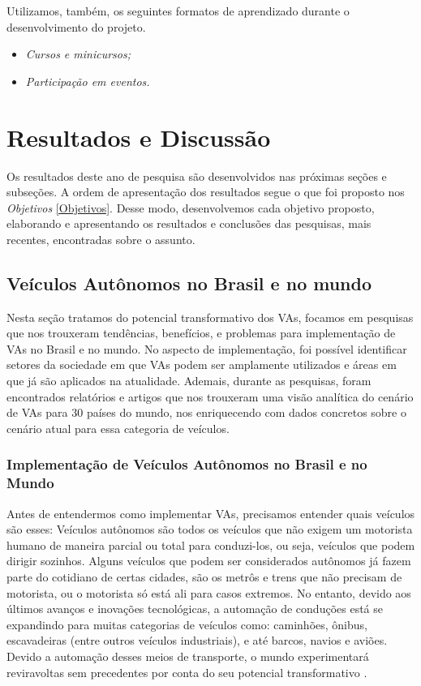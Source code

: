 \vspace {0,5cm}

Utilizamos, também, os seguintes formatos de aprendizado durante o desenvolvimento do projeto.
\begin{itemize}
\item \textit{Cursos e minicursos;}
\item \textit{Participação em eventos.}
\end{itemize}

\newpage

\chapter{Resultados e Discussão} \label{resultados}

Os resultados deste ano de pesquisa são desenvolvidos nas próximas seções e subseções. A ordem de apresentação dos resultados segue o que foi proposto nos \textit{Objetivos} \ref{Objetivos}. Desse modo, desenvolvemos cada objetivo proposto, elaborando e apresentando os resultados e conclusões das pesquisas, mais recentes, encontradas sobre o assunto.

\section{Veículos Autônomos no Brasil e no mundo}

Nesta seção tratamos do potencial transformativo dos VAs, focamos em pesquisas que nos trouxeram tendências, benefícios, e problemas para implementação de VAs no Brasil e no mundo. No aspecto de implementação, foi possível identificar setores da sociedade em que VAs podem ser amplamente utilizados e áreas em que já são aplicados na atualidade. Ademais, durante as pesquisas, foram encontrados relatórios e artigos que nos trouxeram uma visão analítica do cenário de VAs para 30 países do mundo, nos enriquecendo com dados concretos sobre o cenário atual para essa categoria de veículos. 

\subsection{Implementação de Veículos Autônomos no Brasil e no Mundo}

Antes de entendermos como implementar VAs, precisamos entender quais veículos são esses: Veículos autônomos são todos os veículos que não exigem um motorista humano de maneira parcial ou total para conduzi-los, ou seja, veículos que podem dirigir sozinhos. Alguns veículos que podem ser considerados autônomos já fazem parte do cotidiano de certas cidades, são os metrôs e trens que não precisam de motorista, ou o motorista só está ali para casos extremos. No entanto, devido aos últimos avanços e inovações tecnológicas, a automação de conduções está se expandindo para muitas categorias de veículos como: caminhões, ônibus, escavadeiras (entre outros veículos industriais), e até barcos, navios e aviões. Devido a automação desses meios de transporte, o mundo experimentará reviravoltas sem precedentes por conta do seu potencial transformativo \cite{4cenarios_ocidental}.

